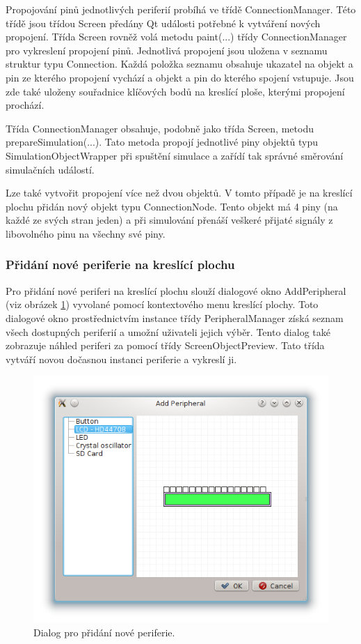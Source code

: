 Propojování pinů jednotlivých periferií probíhá ve třídě ConnectionManager. Této třídě jsou třídou Screen předány Qt události potřebné k vytváření nových propojení. Třída Screen rovněž volá metodu paint(...) třídy ConnectionManager pro vykreslení propojení pinů. Jednotlivá propojení jsou uložena v seznamu struktur typu Connection. Každá položka seznamu obsahuje ukazatel na objekt a pin ze kterého propojení vychází a objekt a pin do kterého spojení vstupuje. Jsou zde také uloženy souřadnice klíčových bodů na kreslící ploše, kterými propojení prochází.

Třída ConnectionManager obsahuje, podobně jako třída Screen, metodu prepareSimulation(...). Tato metoda propojí jednotlivé piny objektů typu SimulationObjectWrapper při spuštění simulace a zařídí tak správné směrování simulačních událostí.

Lze také vytvořit propojení více než dvou objektů. V tomto případě je na kreslící plochu přidán nový objekt typu ConnectionNode. Tento objekt má 4 piny (na každé ze svých stran jeden) a při simulování přenáší veškeré přijaté signály z libovolného pinu na všechny své piny.

\subsubsection{Přidání nové periferie na kreslící plochu}

Pro přidání nové periferi na kreslící plochu slouží dialogové okno AddPeripheral (viz obrázek \ref{fig:addperipheral}) vyvolané pomocí kontextového menu kreslící plochy. Toto dialogové okno prostřednictvím instance třídy PeripheralManager získá seznam všech dostupných periferií a umožní uživateli jejich výběr. Tento dialog také zobrazuje náhled periferi za pomocí třídy ScreenObjectPreview. Tato třída vytváří novou dočasnou instanci periferie a vykreslí ji.

\begin{figure}[ht]
\centering
\includegraphics[trim=0cm 0cm 0cm 0cm]{fig/addperipheral}
\caption{Dialog pro přidání nové periferie.}
\label{fig:addperipheral}
\end{figure}

